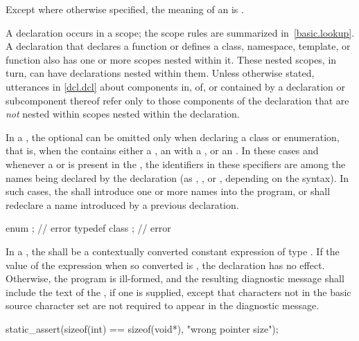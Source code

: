 \pnum
Except where otherwise specified, the meaning of an 
is .

\pnum
{}%
%
A declaration occurs in a scope; the scope rules are
summarized in~\ref{basic.lookup}. A declaration that declares a function
or defines a class, namespace, template, or function also has one or
more scopes nested within it. These nested scopes, in turn, can have
declarations nested within them. Unless otherwise stated, utterances in
\ref{dcl.dcl} about components in, of, or contained by a
declaration or subcomponent thereof refer only to those components of
the declaration that are \emph{not} nested within scopes nested within
the declaration.

\pnum
{}%
%
In a , the optional
 can be omitted only when declaring a
class or enumeration, that is,
when the  contains either a
, an  with
a , or an
. In these cases and whenever a
 or  is present in
the , the identifiers in these specifiers
are among the names being declared by the declaration (as
, , or
, depending on the syntax). In such cases,
the  shall introduce one or more names into
the program, or shall redeclare a name introduced by a previous
declaration.
\begin{example}
\begin{codeblock}
enum { };           // error
typedef class { };  // error
\end{codeblock}
\end{example}

\pnum
{}%
In a , the
 shall be
a contextually converted constant expression
of type .
If the value of the expression when
so converted is , the declaration has no
effect. Otherwise, the program is ill-formed, and the resulting
diagnostic message shall include the text of
the , if one is supplied,
except that characters not in the basic
source character set are not required to appear in
the diagnostic message.
\begin{example}
\begin{codeblock}
static_assert(sizeof(int) == sizeof(void*), "wrong pointer size");
\end{codeblock}
\end{example}

